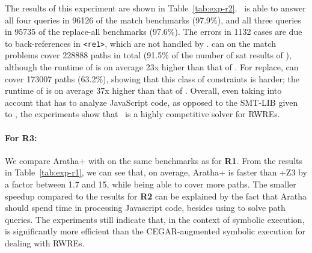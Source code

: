 The results of this experiment are shown in
Table~\ref{tab:exp-r2}. \ostrich\ is able to answer all four queries
in 96126 of the match benchmarks (97.9\%), and all three queries in
95735 of the replace-all benchmarks (97.6\%). The errors in 1132 cases
are due to back-references in \verb!<re1>!, which are not handled by
\ostrich. \expose{} can on the match problems cover 228888 paths in
total (91.5\% of the number of sat results of \ostrich), although the
runtime of \expose{} is on average 23x higher than that of
\ostrich. For replace, \expose{} can cover 173007 paths (63.2\%),
showing that this class of constraints is harder; the runtime of
\expose{} is on average 37x higher than that of \ostrich.  Overall,
even taking into account that \expose{} has to analyze JavaScript
code, as opposed to the SMT-LIB given to \ostrich, the experiments
show that \ostrich\ is a highly competitive solver for RWREs.

\paragraph{For \textbf{R3}:} We compare Aratha+{\ostrich} with \expose{}
on the same benchmarks as for \textbf{R1}.  From the results in
Table~\ref{tab:exp-r1}, we can see that, on average, Aratha+{\ostrich}
is faster than \expose{}+Z3 by a factor between 1.7 and 15, while being
able to cover more paths. The smaller speedup compared to the results
for \textbf{R2} can be explained by the fact that Aratha should spend time in processing Javascript code, besides using {\ostrich} to solve path queries.
The experiments still indicate that,
in the context of symbolic execution, {\ostrich} is significantly more
efficient than the CEGAR-augmented symbolic execution for dealing
with RWREs.
